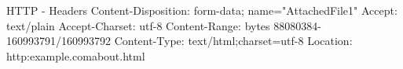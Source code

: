 \begin{frame}{HTTP - Headers}
  Content-Disposition: form-data; name="AttachedFile1"\newline
  \newline
  Accept: text/plain\newline
  Accept-Charset: utf-8\newline
  Content-Range: bytes 88080384-160993791/160993792\newline
  \newline
  Content-Type: text/html;charset=utf-8\newline
  Location: http:\/\/example.com\/about.html\newline
\end{frame}